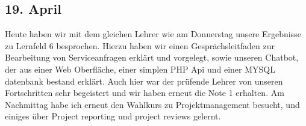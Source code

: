 \subsection{19. April}
Heute haben wir mit dem gleichen Lehrer wie am Donnerstag unsere Ergebnisse zu Lernfeld 6 besprochen. Hierzu haben wir einen Gesprächsleitfaden zur Bearbeitung von Serviceanfragen erklärt und vorgelegt, sowie unseren Chatbot, der aus einer Web Oberfläche, einer simplen PHP Api und einer MYSQL datenbank bestand erklärt. Auch hier war der prüfende Lehrer von unseren Fortschritten sehr begeistert und wir haben erneut die Note 1 erhalten. Am Nachmittag habe ich erneut den Wahlkurs zu Projektmanagement besucht, und einiges über Project reporting und project reviews gelernt.